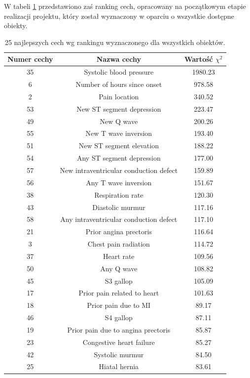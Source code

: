 \documentclass{article}
\begin{document}
W tabeli \ref{tab:feature-ranking-table} przedstawiono zaś ranking cech, opracowany na początkowym etapie realizacji projektu, który został wyznaczony w oparciu o wszystkie dostępne obiekty.

\begin{center}
	\begin{longtable}{ |c|c|c| }
		\caption{25 najlepszych cech wg rankingu wyznaczonego dla wszystkich obiektów.}
		\label{tab:feature-ranking-table}\\
		\hline
			Numer cechy & Nazwa cechy & Wartość $\chi^2$ \\
		\hline
			35 & Systolic blood pressure & 1980.23 \\
			6 & Number of hours since onset & 978.58 \\
			2 & Pain location & 340.52 \\
			53 & New ST segment depression & 223.47 \\
			49 & New Q wave & 200.26 \\
			55 & New T wave inversion & 193.40 \\
			51 & New ST segment elevation & 188.22 \\
			54 & Any ST segment depression & 177.00 \\
			57 & New intraventricular conduction defect & 159.89 \\
			56 & Any T wave inversion & 151.67 \\
			38 & Respiration rate & 120.30 \\
			43 & Diastolic murmur & 117.16 \\
			58 & Any intraventricular conduction defect & 117.10 \\
			21 & Prior angina prectoris & 116.64 \\
			3 & Chest pain radiation & 114.72 \\
			37 & Heart rate & 109.56 \\
			50 & Any Q wave & 108.82 \\
			45 & S3 gallop & 105.09 \\
			17 & Prior pain related to heart & 101.63 \\
			18 & Prior pain due to MI & 89.17 \\
			46 & S4 gallop & 87.11 \\
			19 & Prior pain due to angina prectoris & 85.87 \\
			23 & Congestive heart failure & 85.27 \\
			42 & Systolic murmur & 84.50 \\
			25 & Hiatal hernia & 83.61 \\
		\hline
	\end{longtable}
\end{center}
\end{document}
